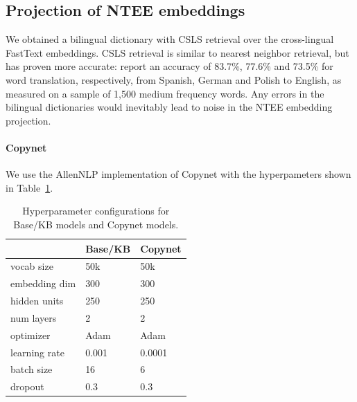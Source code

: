 \documentclass[11pt]{article}
\begin{document}
\subsection{Projection of NTEE embeddings}
\label{projection}
We obtained a bilingual dictionary with CSLS retrieval over the cross-lingual FastText embeddings. CSLS retrieval is similar to nearest neighbor retrieval, but has proven more accurate: \cite{joulin-etal-2018-loss} report an accuracy of 83.7\%, 77.6\% and 73.5\% for word translation, respectively, from Spanish, German and Polish to English, as measured on a sample of 1,500 medium frequency words. Any errors in the bilingual dictionaries would inevitably lead to noise in the NTEE embedding projection.

\paragraph{Copynet}
We use the AllenNLP \cite{Gardner2017AllenNLP} implementation of Copynet with the hyperpameters shown in  Table~\ref{tab:hps}.

\begin{table}[]
    \centering
    \small
    \begin{tabular}{lll}
         &  Base/KB & Copynet \\
         \hline
         vocab size & 50k & 50k \\
         embedding dim & 300 & 300 \\
         hidden units & 250 & 250 \\
         num layers & 2 & 2 \\
         optimizer & Adam & Adam \\
         learning rate & 0.001 & 0.0001 \\
         batch size & 16 & 6 \\
         dropout & 0.3 & 0.3 \\

    \end{tabular}
    \caption{Hyperparameter configurations for Base/KB models and Copynet models.}
    \label{tab:hps}
\end{table}
\end{document}
